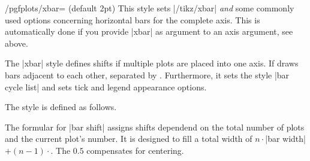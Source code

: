 \begin{stylekey}{/pgfplots/xbar= (default 2pt)}
	This style sets |/tikz/xbar| \emph{and} some commonly used options concerning horizontal bars for the complete axis. This is automatically done if you provide |xbar| as argument to an axis argument, see above.

The |xbar| style defines shifts if multiple plots are placed into one axis. If draws bars adjacent to each other, separated by . Furthermore, it sets the style |bar cycle list| and sets tick and legend appearance options.

The style is defined as follows.
The formular for |bar shift| assigns shifts dependend on the total number of plots and the current plot's number. It is designed to fill a total width of $n \cdot $|bar width|$ + (n-1) \cdot $. The $0.5$ compensates for centering.
\end{stylekey}

